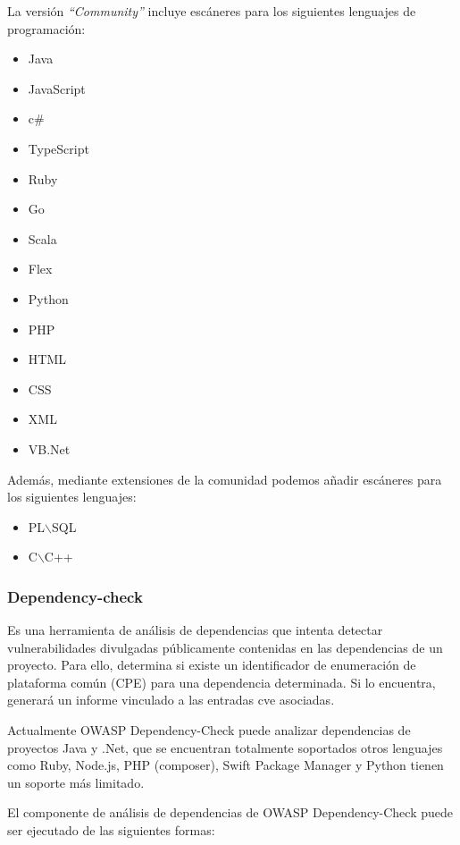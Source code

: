 La versión \emph{“Community”} incluye escáneres para los siguientes lenguajes de programación:

\begin{multicols}{2}
    \begin{itemize}
        \item Java
        \item JavaScript
        \item c\#
        \item TypeScript
        \item Ruby
        \item Go
        \item Scala
        \item Flex 
        \item Python
        \item PHP
        \item HTML 
        \item CSS
        \item XML
        \item VB.Net
    \end{itemize}
\end{multicols}

Además, mediante extensiones de la comunidad podemos añadir escáneres para los siguientes lenguajes:

\begin{itemize}	
    \item PL$\backslash$SQL
    \item C$\backslash$C++
\end{itemize}    
\newpage
\subsubsection{Dependency-check}
Es una herramienta de análisis de dependencias que intenta detectar vulnerabilidades divulgadas públicamente contenidas en las dependencias de 
un proyecto. Para ello, determina si existe un identificador de enumeración de plataforma común (CPE) para una dependencia determinada. Si lo encuentra, generará
un informe vinculado a las entradas \gls{cve} asociadas.

Actualmente OWASP Dependency-Check puede analizar dependencias de proyectos Java y .Net, que se encuentran totalmente soportados otros lenguajes como Ruby, Node.js, 
PHP (composer), Swift Package Manager y Python tienen un soporte más limitado.

El componente de análisis de dependencias de OWASP Dependency-Check puede ser ejecutado de las siguientes formas:

